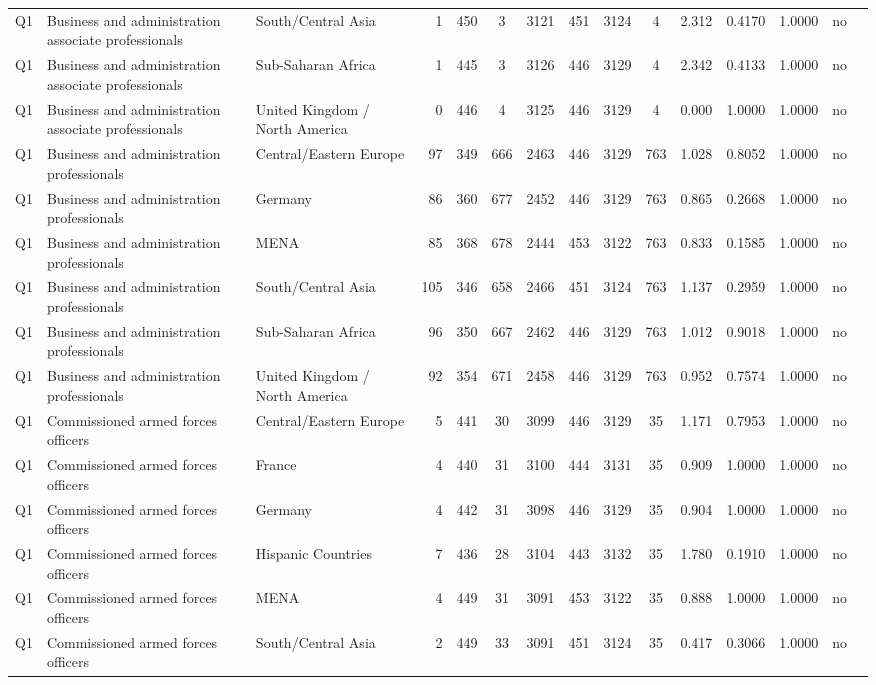 \begin{longtable}{lllrcccccccccll}
Q1 & Business and administration associate professionals & South/Central Asia & 1 & 450 & 3 & 3121 & 451 & 3124 & 4 & 2.312 & 0.4170 & 1.0000 & no \\
Q1 & Business and administration associate professionals & Sub-Saharan Africa & 1 & 445 & 3 & 3126 & 446 & 3129 & 4 & 2.342 & 0.4133 & 1.0000 & no \\
Q1 & Business and administration associate professionals & United Kingdom / North America & 0 & 446 & 4 & 3125 & 446 & 3129 & 4 & 0.000 & 1.0000 & 1.0000 & no \\
Q1 & Business and administration professionals & Central/Eastern Europe & 97 & 349 & 666 & 2463 & 446 & 3129 & 763 & 1.028 & 0.8052 & 1.0000 & no \\
Q1 & Business and administration professionals & Germany & 86 & 360 & 677 & 2452 & 446 & 3129 & 763 & 0.865 & 0.2668 & 1.0000 & no \\
Q1 & Business and administration professionals & MENA & 85 & 368 & 678 & 2444 & 453 & 3122 & 763 & 0.833 & 0.1585 & 1.0000 & no \\
Q1 & Business and administration professionals & South/Central Asia & 105 & 346 & 658 & 2466 & 451 & 3124 & 763 & 1.137 & 0.2959 & 1.0000 & no \\
Q1 & Business and administration professionals & Sub-Saharan Africa & 96 & 350 & 667 & 2462 & 446 & 3129 & 763 & 1.012 & 0.9018 & 1.0000 & no \\
Q1 & Business and administration professionals & United Kingdom / North America & 92 & 354 & 671 & 2458 & 446 & 3129 & 763 & 0.952 & 0.7574 & 1.0000 & no \\
Q1 & Commissioned armed forces officers & Central/Eastern Europe & 5 & 441 & 30 & 3099 & 446 & 3129 & 35 & 1.171 & 0.7953 & 1.0000 & no \\
Q1 & Commissioned armed forces officers & France & 4 & 440 & 31 & 3100 & 444 & 3131 & 35 & 0.909 & 1.0000 & 1.0000 & no \\
Q1 & Commissioned armed forces officers & Germany & 4 & 442 & 31 & 3098 & 446 & 3129 & 35 & 0.904 & 1.0000 & 1.0000 & no \\
Q1 & Commissioned armed forces officers & Hispanic Countries & 7 & 436 & 28 & 3104 & 443 & 3132 & 35 & 1.780 & 0.1910 & 1.0000 & no \\
Q1 & Commissioned armed forces officers & MENA & 4 & 449 & 31 & 3091 & 453 & 3122 & 35 & 0.888 & 1.0000 & 1.0000 & no \\
Q1 & Commissioned armed forces officers & South/Central Asia & 2 & 449 & 33 & 3091 & 451 & 3124 & 35 & 0.417 & 0.3066 & 1.0000 & no \\

\end{longtable}
